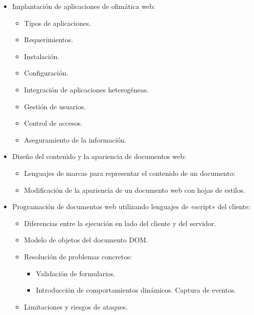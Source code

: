 \documentclass[a4paper]{article}
\begin{document}
\begin{itemize}
\item Implantación de aplicaciones de ofimática web:
\begin{itemize}
\item Tipos de aplicaciones.
\item Requerimientos.
\item Instalación.
\item Configuración.
\item Integración de aplicaciones heterogéneas.
\item Gestión de usuarios.
\item Control de accesos.
\item Aseguramiento de la información.
\end{itemize}
\end{itemize}
\begin{itemize}
\item Diseño del contenido y la apariencia de documentos web:
\begin{itemize}
\item Lenguajes de marcas para representar el contenido de un documento:
\item Modificación de la apariencia de un documento web con hojas de estilos.
\end{itemize}
\end{itemize}
\begin{itemize}
\item Programación de documentos web utilizando lenguajes de «script» del cliente:
\begin{itemize}
\item Diferencias entre la ejecución en lado del cliente y del servidor.
\item Modelo de objetos del documento DOM.
\item Resolución de problemas concretos:
\begin{itemize}
\item Validación de formularios.
\item Introducción de comportamientos dinámicos. Captura de eventos.
\end{itemize}
\item Limitaciones y riesgos de ataques.
\end{itemize}
\end{itemize}
\end{document}

